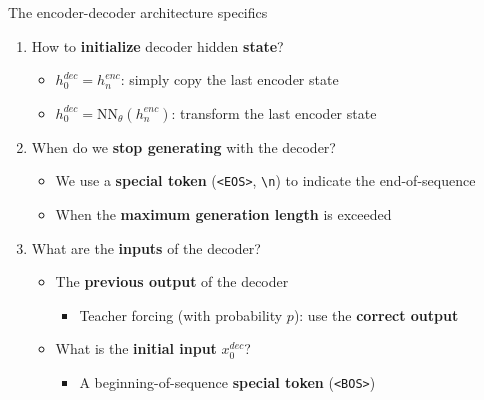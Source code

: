 \documentclass[12pt,aspectratio=169,handout]{beamer}
\begin{document}
\begin{frame}[fragile]{The encoder-decoder architecture specifics}

\begin{enumerate}
\item How to \textbf{initialize} decoder hidden \textbf{state}?
\pause
\begin{itemize}
	\item $h_{0}^{dec} = h_{n}^{enc}$: simply copy the last encoder state
	\item $h_{0}^{dec} = \text{NN}_{\theta}(h_{n}^{enc})$: transform the last encoder state
\end{itemize}
\pause
\item When do we \textbf{stop generating} with the decoder?
\pause
\begin{itemize}
	\item We use a \textbf{special token} (\verb|<EOS>|, \verb|\n|) to indicate the end-of-sequence
	\item When the \textbf{maximum generation length} is exceeded
\end{itemize}
\pause
\item What are the \textbf{inputs} of the decoder?
\pause
\begin{itemize}
	\item The \textbf{previous output} of the decoder
	\begin{itemize}
		\item Teacher forcing (with probability $p$): use the \textbf{correct output} 
	\end{itemize}
	\pause
	\item What is the \textbf{initial input} $x^{dec}_0$?
	\pause
	\begin{itemize}
		\item A beginning-of-sequence \textbf{special token} (\verb|<BOS>|)
	\end{itemize}
\end{itemize}

\end{enumerate}

\end{frame}
\end{document}
